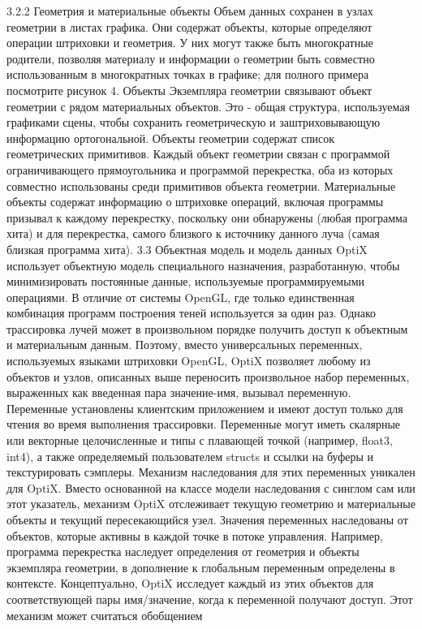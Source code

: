 3.2.2 Геометрия и материальные объекты
Объем данных сохранен в узлах геометрии в листах графика. Они содержат объекты, которые определяют операции штриховки и геометрия. У них могут также быть многократные родители, позволяя материалу и информации о геометрии быть совместно использованным в многократных точках в графике; для полного примера посмотрите рисунок 4. Объекты Экземпляра геометрии связывают объект геометрии с рядом материальных объектов. Это - общая структура, используемая графиками сцены, чтобы сохранить геометрическую и заштриховывающую информацию ортогональной. Объекты геометрии содержат список геометрических примитивов. Каждый объект геометрии связан с программой ограничивающего прямоугольника и программой перекрестка, оба из которых совместно использованы среди примитивов объекта геометрии.
Материальные объекты содержат информацию о штриховке операций, включая программы призывал к каждому перекрестку, поскольку они обнаружены (любая программа хита) и для перекрестка, самого близкого к источнику данного луча (самая близкая программа хита).
3.3 Объектная модель и модель данных
OptiX использует объектную модель специального назначения, разработанную, чтобы минимизировать постоянные данные, используемые программируемыми операциями. В отличие от системы OpenGL, где только единственная комбинация программ построения теней используется за один раз. Однако трассировка лучей может в произвольном порядке получить доступ к объектным и материальным данным. Поэтому, вместо универсальных переменных, используемых языками штриховки OpenGL, OptiX позволяет любому из объектов и узлов, описанных выше переносить произвольное
набор переменных, выраженных как введенная пара значение-имя, вызывал переменную. Переменные установлены клиентским приложением и имеют доступ только для чтения во время выполнения трассировки. Переменные могут иметь скалярные или векторные целочисленные и типы с плавающей точкой (например, float3, int4), а также определяемый пользователем structs и ссылки на буферы и текстурировать сэмплеры. Механизм наследования для этих переменных уникален для OptiX.
Вместо основанной на классе модели наследования с синглом сам или этот указатель, механизм OptiX отслеживает текущую геометрию и материальные объекты и текущий пересекающийся узел. Значения переменных наследованы от объектов, которые активны в каждой точке в потоке управления. Например, программа перекрестка наследует определения от
геометрия и объекты экземпляра геометрии, в дополнение к глобальным переменным определены в контексте. Концептуально, OptiX исследует каждый из этих объектов для соответствующей пары имя/значение, когда к переменной получают доступ. Этот механизм может считаться обобщением
